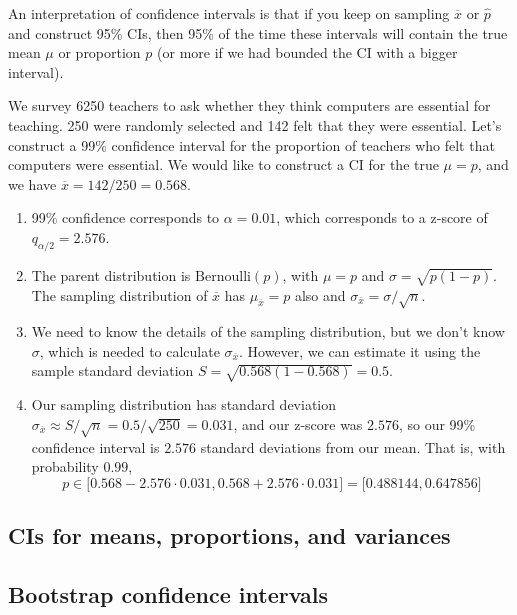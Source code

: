 \documentclass{article}
\begin{document}
    An interpretation of confidence intervals is that if you keep on sampling $\overline{x}$ or $\widehat{p}$ and construct 95\% CIs, then 95\% of the time these intervals will contain the true mean $\mu$ or proportion $p$ (or more if we had bounded the CI with a bigger interval). 

    \begin{example}
      We survey 6250 teachers to ask whether they think computers are essential for teaching. 250 were randomly selected and 142 felt that they were essential. Let's construct a 99\% confidence interval for the proportion of teachers who felt that computers were essential. We would like to construct a CI for the true $\mu = p$, and we have $\overline{x} = 142/250 = 0.568$. 
      \begin{enumerate}
        \item 99\% confidence corresponds to $\alpha = 0.01$, which corresponds to a z-score of $q_{\alpha/2} = 2.576$. 
        \item The parent distribution is $\mathrm{Bernoulli}(p)$, with $\mu = p$ and $\sigma = \sqrt{p (1 - p)}$. The sampling distribution of $\overline{x}$ has $\mu_{\overline{x}} = p$ also and $\sigma_{\overline{x}} = \sigma / \sqrt{n}$. 
        \item We need to know the details of the sampling distribution, but we don't know $\sigma$, which is needed to calculate $\sigma_{\overline{x}}$. However, we can estimate it using the sample standard deviation $S = \sqrt{0.568 (1 - 0.568)} = 0.5$. 
        \item Our sampling distribution has standard deviation $\sigma_{\overline{x}} \approx S / \sqrt{n} = 0.5 / \sqrt{250} = 0.031$, and our z-score was $2.576$, so our 99\% confidence interval is $2.576$ standard deviations from our mean. That is, with probability $0.99$, 
        \begin{equation}
          p \in \big[ 0.568 - 2.576 \cdot 0.031, 0.568 + 2.576 \cdot 0.031 \big] = \big[ 0.488144, 0.647856 \big]
        \end{equation}
      \end{enumerate}
    \end{example}

  \subsection{CIs for means, proportions, and variances}

  \subsection{Bootstrap confidence intervals}
\end{document}
